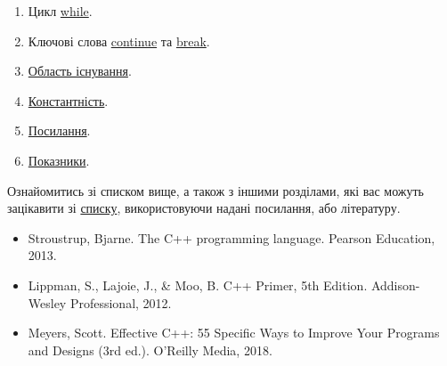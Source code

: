 \documentclass[12pt]{article}
\begin{document}
\begin{enumerate}
		\item Цикл \href{https://en.cppreference.com/w/cpp/language/while}{while}.
		\item Ключові слова \href{https://en.cppreference.com/w/cpp/language/continue}{continue} та \href{https://en.cppreference.com/w/cpp/language/break}{break}.
		\item \href{https://en.cppreference.com/w/cpp/language/scope}{Область існування}.
		\item \href{https://en.cppreference.com/w/cpp/language/cv}{Константність}.
		\item \href{https://en.cppreference.com/w/cpp/language/reference}{Посилання}.
		\item \href{https://en.cppreference.com/w/cpp/language/pointer}{Показники}.
	\end{enumerate}

	Ознайомитись зі списком вище, а також з іншими розділами, які вас можуть зацікавити зі \href{https://en.cppreference.com/w/cpp/language}{списку}, використовуючи надані посилання, або літературу.

	
	\begin{itemize}
		\item Stroustrup, Bjarne. The C++ programming language. Pearson Education, 2013.
		\item Lippman, S., Lajoie, J., \& Moo, B. C++ Primer, 5th Edition. Addison-Wesley Professional, 2012.
		\item Meyers, Scott. Effective C++: 55 Specific Ways to Improve Your Programs and Designs (3rd ed.). O'Reilly Media, 2018.
	\end{itemize}
\end{document}
